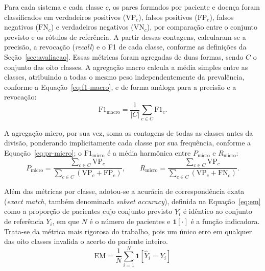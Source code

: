 Para cada sistema e cada classe $c$, os pares formados por paciente e doença foram classificados em verdadeiros positivos ($\mathrm{VP}_c$), falsos positivos ($\mathrm{FP}_c$), falsos negativos ($\mathrm{FN}_c$) e verdadeiros negativos ($\mathrm{VN}_c$), por comparação entre o conjunto previsto e os rótulos de referência. A partir dessas contagens, calcularam-se a precisão, a revocação (\textit{recall}) e o F1 de cada classe, conforme as definições da Seção~\ref{sec:avaliacao}. Essas métricas foram agregadas de duas formas, sendo $C$ o conjunto das oito classes. A agregação macro calcula a média simples entre as classes, atribuindo a todas o mesmo peso independentemente da prevalência, conforme a Equação~\eqref{eq:f1-macro}, e de forma análoga para a precisão e a revocação:
\begin{equation}
\mathrm{F1}_{\text{macro}} = \frac{1}{|C|}\sum_{c \in C} \mathrm{F1}_c .
\label{eq:f1-macro}
\end{equation}

A agregação micro, por sua vez, soma as contagens de todas as classes antes da divisão, ponderando implicitamente cada classe por sua frequência, conforme a Equação~\eqref{eq:pr-micro}; o $\mathrm{F1}_{\text{micro}}$ é a média harmônica entre $P_{\text{micro}}$ e $R_{\text{micro}}$:
\begin{equation}
P_{\text{micro}} = \frac{\sum_{c \in C} \mathrm{VP}_c}{\sum_{c \in C} \left(\mathrm{VP}_c + \mathrm{FP}_c\right)},
\qquad
R_{\text{micro}} = \frac{\sum_{c \in C} \mathrm{VP}_c}{\sum_{c \in C} \left(\mathrm{VP}_c + \mathrm{FN}_c\right)} .
\label{eq:pr-micro}
\end{equation}

Além das métricas por classe, adotou-se a acurácia de correspondência exata (\textit{exact match}, também denominada \textit{subset accuracy}), definida na Equação~\eqref{eq:em} como a proporção de pacientes cujo conjunto previsto $\hat{Y}_i$ é idêntico ao conjunto de referência $Y_i$, em que $N$ é o número de pacientes e $\mathbf{1}[\cdot]$ é a função indicadora. Trata-se da métrica mais rigorosa do trabalho, pois um único erro em qualquer das oito classes invalida o acerto do paciente inteiro.
\begin{equation}
\mathrm{EM} = \frac{1}{N}\sum_{i=1}^{N} \mathbf{1}\left[\hat{Y}_i = Y_i\right]
\label{eq:em}
\end{equation}

